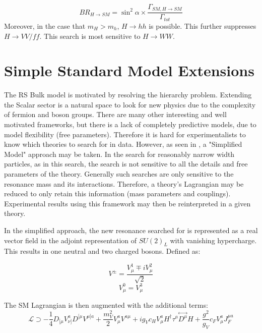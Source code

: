 \begin{equation}
BR_{H \rightarrow SM}=\sin^{2}\alpha \times \frac{\Gamma_{SM, H \rightarrow SM}}{\Gamma_{tot}}
\end{equation}
Moreover, in the case that $m_{H} > m_{h}$, $H\rightarrow hh$ is possible. This further suppresses $H \rightarrow VV/ff$. This search is most sensitive to $H \rightarrow WW$.


\section{Simple Standard Model Extensions}
The RS Bulk model is motivated by resolving the hierarchy problem. Extending the Scalar sector is a natural space to look for new physics due to the complexity of fermion and boson groups. There are many other interesting and well motivated frameworks, but there is a lack of completely predictive models, due to model flexibility (free parameters). Therefore it is hard for experimentalists to know which theories to search for in data. However, as seen in \cite{hvt}, a "Simplified Model" approach may be taken. In the search for reasonably narrow width particles, as in this search, the search is not sensitive to all the details and free parameters of the theory. Generally such searches are only sensitive to the resonance mass and its interactions. Therefore, a theory's Lagrangian may be reduced to only retain this information (mass parameters and couplings). Experimental results using this framework may then be reinterpreted in a given theory. 

In the simplified approach, the new resonance searched for is represented as a real vector field in the adjoint representation of $SU(2)_{L}$ with vanishing hypercharge. This results in one neutral and two charged bosons. Defined as:

\begin{equation}
V^{\pm}=\frac{V^{1}_{\mu}\mp iV^{2}_{\mu}}{\sqrt{2}}
\end{equation}
\begin{equation}
V^{0}_{\mu}=V^{3}_{\mu}
\end{equation}

The SM Lagrangian is then augmented with the additional terms:
\begin{equation}
\mathcal{L}\supset -\frac{1}{4}D_{[\mu}V^{a}_{\nu]}D^{[\mu}V^{\mu]a} + \frac{m_{V}^{2}}{2}V^{a}_{\mu}V^{a\mu} + ig_{V}c_{H}V^{a}_{\mu}H^{\dag}\tau^{a}\overset\leftrightarrow{D^{\mu}}H+\frac{g^{2}}{g_{V}}c_{F}V^{a}_{\mu}J_{F}^{\mu a}
\end{equation}


